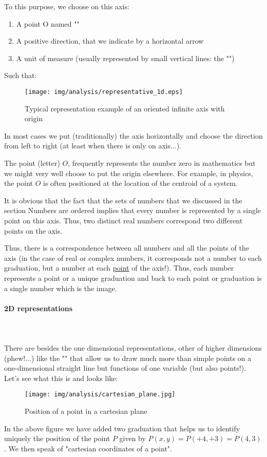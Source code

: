 	To this purpose, we choose on this axis:
	\begin{enumerate}
		\item A point O named ""
		\item A positive direction, that we indicate by a horizontal arrow
		\item A unit of measure (usually represented by small vertical lines: the "")
	\end{enumerate}
Such that:
\begin{figure}[H]
\centering
\texttt{[image: img/analysis/representative\_1d.eps]}
\caption{Typical representation example of an oriented infinite axis with origin}
\end{figure}
	In most cases we put (traditionally) the axis horizontally and choose the direction from left to right (at least when there is only on axis...).
	\begin{tcolorbox}[title=Remark,colframe=black,arc=10pt]
	The point (letter) $O$, frequently represents the number zero in mathematics but we might very well choose to put the origin elsewhere. For example, in physics, the point $O$ is often positioned at the location of the centroid of a system. 
	\end{tcolorbox}
	It is obvious that the fact that the sets of numbers that we discussed in the section Numbers are ordered implies that every number is represented by a single point on this axis. Thus, two distinct real numbers correspond two different points on the axis.

	Thus, there is a correspondence between all numbers and all the points of the axis (in the case of real or complex numbers, it corresponds not a number to each graduation, but a number at each \underline{point} of the axis!). Thus, each number represents a point or a unique graduation and back to each point or graduation is a single number which is the image.

\pagebreak
\paragraph{2D representations}\mbox{}\\\\
There are besides the one dimensional representations, other of higher dimensions (phew!...) like the "" that allow us to draw much more than simple points on a one-dimensional straight line but functions of one variable (but also points!). Let's see what this is and looks like:
\begin{figure}[H]
	\centering
	\texttt{[image: img/analysis/cartesian\_plane.jpg]}
	\caption{Position of a point in a cartesian plane}
\end{figure}
In the above figure we have added two graduation that helps us to identify uniquely the position of the point $P$ given by $P(x,y)=P(+4,+3)=P(4,3)$. We then speak of "cartesian coordinates of a point".

